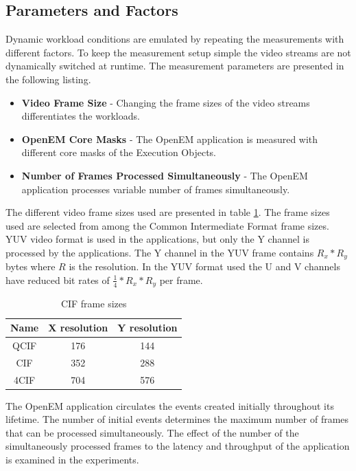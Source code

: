 \subsection{Parameters and Factors}
\label{subsec:parameters-and-factors}
Dynamic workload conditions are emulated by repeating the measurements with different factors. To keep the measurement setup simple the video streams are not dynamically switched at runtime. The measurement parameters are presented in the following listing.

\begin{itemize}
    \item \textbf{Video Frame Size} - Changing the frame sizes of the video streams differentiates the workloads.
    \item \textbf{OpenEM Core Masks} - The OpenEM application is measured with different core masks of the Execution Objects.
    \item \textbf{Number of Frames Processed Simultaneously} - The OpenEM application processes variable number of frames simultaneously.
\end{itemize}

The different video frame sizes used are presented in table \ref{tab:cif_frames}. The frame sizes used are selected from among the Common Intermediate Format frame sizes. YUV video format is used in the applications, but only the Y channel is processed by the applications. The Y channel in the YUV frame contains $R_{x} * R_{y}$ bytes where $R$ is the resolution. In the YUV format used the U and V channels have reduced bit rates of $\frac{1}{4} * R_{x} * R_{y}$ per frame.

\begin{table}
    \begin{center}
        \begin{tabular}{ c c c }
            Name  & X resolution  & Y resolution \\ \hline
            QCIF  & 176           & 144          \\ \hline
            CIF   & 352           & 288          \\ \hline
            4CIF  & 704           & 576          \\ \hline
        \end{tabular}
        \caption{CIF frame sizes}
        \label{tab:cif_frames}
    \end{center}
\end{table}

The OpenEM application circulates the events created initially throughout its lifetime. The number of initial events determines the maximum number of frames that can be processed simultaneously. The effect of the number of the simultaneously processed frames to the latency and throughput of the application is examined in the experiments.

